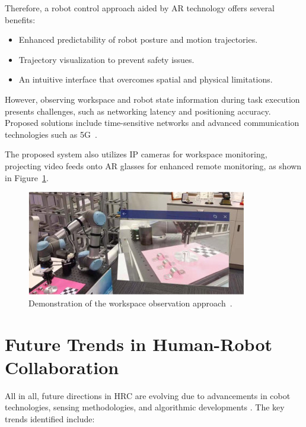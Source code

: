 Therefore, a robot control approach aided by \ac{AR} technology offers several benefits:
\begin{itemize}
    \item Enhanced predictability of robot posture and motion trajectories.
    \item Trajectory visualization to prevent safety issues.
    \item An intuitive interface that overcomes spatial and physical limitations.
\end{itemize}

However, observing workspace and robot state information during task execution presents challenges, such as networking latency and positioning accuracy. Proposed solutions include time-sensitive networks and advanced communication technologies such as 5G~\cite{LI2022102321}.

The proposed system also utilizes IP cameras for workspace monitoring, projecting video feeds onto \ac{AR} glasses for enhanced remote monitoring, as shown in Figure~\ref{f:workspace-visualization}.

\begin{figure}[!htpb]
    \centering
    \includegraphics[width=0.7\linewidth]{figs/workspace-visualization.jpg}
    \caption{Demonstration of the workspace observation approach~\cite{LI2022102321}.}
    \label{f:workspace-visualization}
\end{figure}
\FloatBarrier




\section{Future Trends in Human-Robot Collaboration}

All in all, future directions in \ac{HRC} are evolving due to advancements in cobot technologies, sensing methodologies, and algorithmic developments \cite{robotics8040100}. The key trends identified include:

